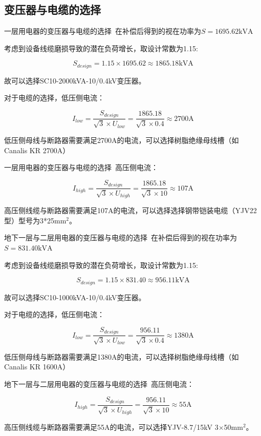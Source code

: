 \documentclass{beamer}
\begin{document}
    \subsection{变压器与电缆的选择}
    \begin{frame}{一层用电器的变压器与电缆的选择}{\thesubsection \, \subsecname}
    在补偿后得到的视在功率为$S=1695.62\text{kVA}$

考虑到设备线缆磨损导致的潜在负荷增长，取设计常数为1.15:

$$S_{design}= 1.15 \times 1695.62 \approx 1865.18\text{kVA}$$

故可以选择SC10-2000kVA-10/0.4kV变压器。


对于电缆的选择，低压侧电流：

$$I_{low} = \frac{S_{design}}{\sqrt{3} \times U_{low}} = \frac{1865.18}{\sqrt{3} \times 0.4} \approx 2700\text{A}$$

低压侧母线与断路器需要满足2700A的电流，可以选择树脂绝缘母线槽（如 Canalis KR 2700A）
    \end{frame}
\begin{frame}{一层用电器的变压器与电缆的选择}{\thesubsection \, \subsecname}
高压侧电流：

$$I_{high} = \frac{S_{design}}{\sqrt{3} \times U_{high}} = \frac{1865.18}{\sqrt{3} \times 10} \approx 107\text{A}$$

高压侧线缆与断路器需要满足107A的电流，可以选择选择钢带铠装电缆（YJV22 型）型号为3*25$\text{mm}^2$。
    \end{frame}

    \begin{frame}{地下一层与二层用电器的变压器与电缆的选择}{\thesubsection \, \subsecname}
    在补偿后得到的视在功率为$S=831.40\text{kVA}$

考虑到设备线缆磨损导致的潜在负荷增长，取设计常数为1.15:

$$S_{design}= 1.15 \times 831.40 \approx 956.11\text{kVA}$$

故可以选择SC10-1000kVA-10/0.4kV变压器。

对于电缆的选择，低压侧电流：

$$I_{low} = \frac{S_{design}}{\sqrt{3} \times U_{low}} = \frac{956.11}{\sqrt{3} \times 0.4} \approx 1380\text{A}$$

低压侧母线与断路器需要满足1380A的电流，可以选择树脂绝缘母线槽（如 Canalis KR 1600A）
    \end{frame}
\begin{frame}{地下一层与二层用电器的变压器与电缆的选择}{\thesubsection \, \subsecname}
高压侧电流：

$$I_{high} = \frac{S_{design}}{\sqrt{3} \times U_{high}} = \frac{956.11}{\sqrt{3} \times 10} \approx 55\text{A}$$

高压侧线缆与断路器需要满足55A的电流，可以选择YJV-8.7/15kV 3×50$\text{mm}^2$。
    \end{frame}
\end{document}
